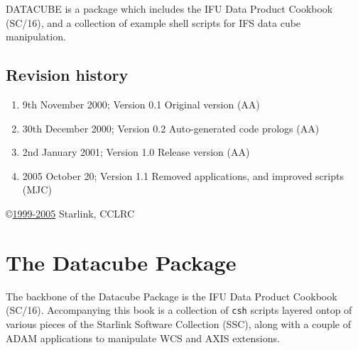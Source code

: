 \documentclass[twoside,11pt]{article}
\newcommand{\stardocinitials}  {SUN}
\newcommand{\stardocnumber}    {237.2}
\newcommand{\stardocabstract}  {  
\htmlref{DATACUBE}{DATACUBE} is a package which includes the IFU Data Product Cookbook (\xref{SC/16}{sc16}{}), and a collection of example shell scripts for IFS data cube manipulation.
}
\newcommand{\stardocname}{\stardocinitials /\stardocnumber}
\newenvironment{latexonly}{}{}
\newcommand{\htmlref}[2]{#1}
\newcommand{\xref}[3]{#1}
\newcommand{\xlabel}[1]{}
\newcommand{\latexonlytoc}[0]{\tableofcontents}
\renewcommand{\thepage}{\roman{page}}
\begin{document}
\stardocabstract
 \newpage
 \vspace{3cm}

 \subsection*{Revision history}

 \begin{enumerate}
   \item 9th November 2000; Version 0.1 Original version (AA) 
   \item 30th December 2000; Version 0.2 Auto-generated code prologs (AA)
   \item 2nd January 2001; Version 1.0 Release version (AA)
   \item 2005 October 20; Version 1.1 Removed applications, and improved scripts (MJC)

 \end{enumerate}

 \vspace{10cm}
 \copyright \underline{1999-2005} Starlink, CCLRC

 \cleardoublepage
 \begin{latexonly}
   \setlength{\parskip}{0mm}
   \latexonlytoc

   \newpage
   \listoffigures

   \setlength{\parskip}{\medskipamount}
   \markright{\stardocname}
 \end{latexonly}

\cleardoublepage
\newpage
\renewcommand{\thepage}{\arabic{page}}
\setcounter{page}{1}


\section{\xlabel{sun237_intro}The Datacube Package\label{sun237_intro}}

The backbone of the Datacube Package is the \xref{IFU Data Product
Cookbook}{sc16}{} (SC/16).  Accompanying this book is a collection of
{\tt csh} scripts layered ontop of various pieces of the Starlink
Software Collection (SSC), along with a couple of ADAM applications to
manipulate WCS and AXIS extensions.
\end{document}
